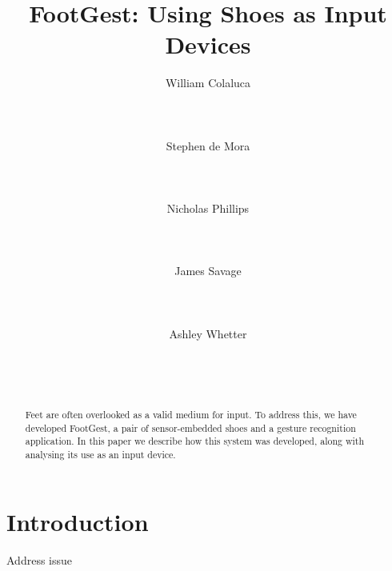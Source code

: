 \documentclass{sigchi}
\begin{document}
\title{FootGest: Using Shoes as Input Devices}

\author{
  \alignauthor William Colaluca\\
    \\
    \\
    \\
  \alignauthor Stephen de Mora\\
    \\
    \\
    \\
  \alignauthor Nicholas Phillips\\
    \\
    \\
    \\
  \alignauthor James Savage\\
    \\
    \\
    \\
  \alignauthor Ashley Whetter\\
    \\
    \\
    \\
}

\maketitle

\begin{abstract}
Feet are often overlooked as a valid medium for input. To address this, we have developed FootGest, a pair of sensor-embedded shoes and a gesture recognition application. In this paper we describe how this system was developed, along with analysing its use as an input device.
\end{abstract}


\section{Introduction}
Address issue
\end{document}
